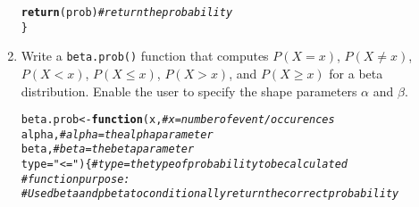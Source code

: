 \documentclass{article}\usepackage[]{graphicx}\usepackage[]{xcolor}
\makeatletter
\newcommand{\hlsng}[1]{\textcolor[rgb]{0.192,0.494,0.8}{#1}}%
\newcommand{\hlcom}[1]{\textcolor[rgb]{0.678,0.584,0.686}{\textit{#1}}}%
\newcommand{\hldef}[1]{\textcolor[rgb]{0.345,0.345,0.345}{#1}}%
\newcommand{\hlkwa}[1]{\textcolor[rgb]{0.161,0.373,0.58}{\textbf{#1}}}%
\newcommand{\hlkwb}[1]{\textcolor[rgb]{0.69,0.353,0.396}{#1}}%
\newcommand{\hlkwc}[1]{\textcolor[rgb]{0.333,0.667,0.333}{#1}}%
\newcommand{\hlkwd}[1]{\textcolor[rgb]{0.737,0.353,0.396}{\textbf{#1}}}%
\newenvironment{kframe}{%
 \def\at@end@of@kframe{}%
 \ifinner\ifhmode%
  \def\at@end@of@kframe{\end{minipage}}%
  \begin{minipage}{\columnwidth}%
 \fi\fi%
 \def\FrameCommand##1{\hskip\@totalleftmargin \hskip-\fboxsep
 \colorbox{shadecolor}{##1}\hskip-\fboxsep
     \hskip-\linewidth \hskip-\@totalleftmargin \hskip\columnwidth}%
 \MakeFramed {\advance\hsize-\width
   \@totalleftmargin\z@ \linewidth\hsize
   \@setminipage}}%
 {\par\unskip\endMakeFramed%
 \at@end@of@kframe}
\newenvironment{knitrout}{}{} %
\makeatother
\begin{document}
\begin{enumerate}
\begin{knitrout}
\begin{kframe}
\begin{alltt}
  \hlkwd{return}\hldef{(prob)} \hlcom{#return the probability}
\hldef{\}}
\end{alltt}
\end{kframe}
\end{knitrout}
    \item Write a \texttt{beta.prob()} function that computes $P(X=x)$, 
    $P(X \neq x)$, $P(X<x)$, $P(X \leq x)$, $P(X > x)$, and $P(X \geq x)$
    for a beta distribution. Enable the user to specify the shape parameters
    $\alpha$ and $\beta$.
\begin{knitrout}\scriptsize
{}\color{fgcolor}\begin{kframe}
\begin{alltt}
\hldef{beta.prob} \hlkwb{<-} \hlkwa{function}\hldef{(}\hlkwc{x}\hldef{,}           \hlcom{#x = number of event/occurences}
                      \hlkwc{alpha}\hldef{,}       \hlcom{#alpha = the alpha parameter}
                      \hlkwc{beta}\hldef{,}        \hlcom{#beta = the beta parameter}
                      \hlkwc{type} \hldef{=} \hlsng{"<="}\hldef{) \{} \hlcom{#type = the type of probability to be calculated}
  \hlcom{#function purpose:}
  \hlcom{#Use dbeta and pbeta to conditionally return the correct probability}


\end{alltt}
\end{kframe}
\end{knitrout}
\end{enumerate}
\end{document}
